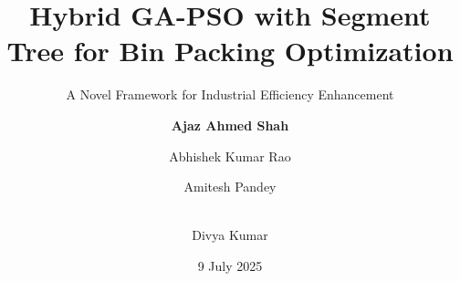 \documentclass[aspectratio=169,12pt]{beamer}
\begin{document}

\title[Hybrid GA-PSO with Segment Tree]{Hybrid GA-PSO with Segment Tree for Bin Packing Optimization}
\subtitle{A Novel Framework for Industrial Efficiency Enhancement}
\author[Shah et al.]{
    \textbf{Ajaz Ahmed Shah} \and 
    Abhishek Kumar Rao \and 
    Amitesh Pandey \and \\
    Divya Kumar
}
\date{9 July 2025}

\begin{frame}
    \titlepage
\end{frame}


\end{document}
